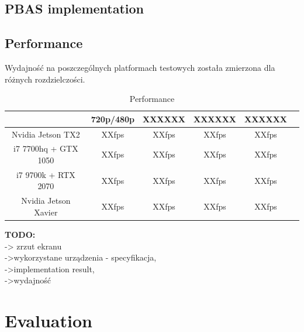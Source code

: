 \documentclass[b5paper,10pt,twoside]{article}
\begin{document}
{\subsection{PBAS implementation}
\label{subsec:pbas_implementation}


\subsection{Performance}
\label{subsec:performance}

Wydajność na poszczególnych platformach testowych została zmierzona dla różnych rozdzielczości.%

\begin{table}[t!]
\caption{Performance}
\centering
\begin{tabular}{|c|c|c|c|c|c|}
\hline
&     720p/480p  & XXXXXX & XXXXXX & XXXXXX \\ \hline
Nvidia Jetson TX2  & XXfps & XXfps & XXfps & XXfps  \\ \hline
i7 7700hq + GTX 1050   & XXfps & XXfps & XXfps & XXfps     \\ \hline
i7 9700k + RTX 2070 & XXfps & XXfps &  XXfps & XXfps    \\ \hline
Nvidia Jetson Xavier  & XXfps    & XXfps    & XXfps & XXfps     \\ \hline
\end{tabular}
\label{tab:performance_res}
\end{table}

\textbf{TODO:}\\
-> zrzut ekranu\\
->wykorzystane urządzenia - specyfikacja,\\
->implementation result,\\
->wydajność


\section{Evaluation}
\label{sec:evaluation}

}
\end{document}
